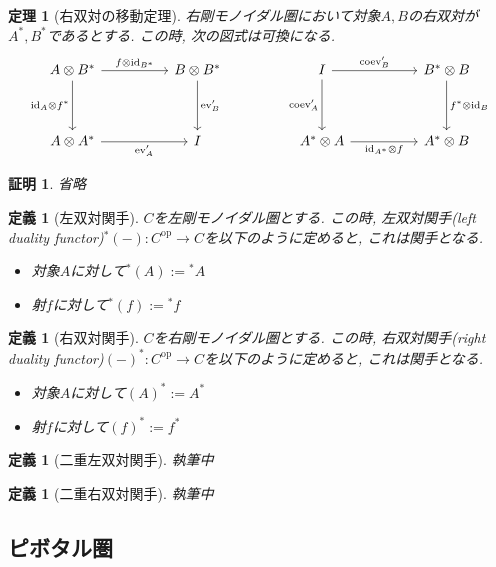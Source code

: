 \documentclass[a4paper,12pt]{ltjsarticle}
\theoremstyle{break}
\newtheorem{defn}[thm]{定義}
\newtheorem{thrm}[thm]{定理}
\newtheorem*{prf}{証明}
\newcommand{\Op}{\mathrm{op}}
\newcommand{\id}{\mathrm{id}}
\newcommand{\eva}{\mathrm{ev}}
\newcommand{\coev}{\mathrm{coev}}
\newcommand{\ot}{\otimes}
\numberwithin{equation}{section}
\begin{document}
\begin{thrm}[右双対の移動定理]
  右剛モノイダル圏において対象$A,B$の右双対が$A^*,B^*$であるとする. 
  この時, 次の図式は可換になる.  
  \[\begin{tikzcd}
    {A \ot B^*} && {B \ot B^*} && I && {B^* \ot B} \\
    \\
    {A \ot A^*} && I && {A^* \ot A} && {A^* \ot B}
    \arrow["{f \ot \id_{B^*}}", from=1-1, to=1-3]
    \arrow["{\id_A \ot f^*}"', from=1-1, to=3-1]
    \arrow["{\eva'_A}"', from=3-1, to=3-3]
    \arrow["{\eva'_B}", from=1-3, to=3-3]
    \arrow["{\coev'_B}", from=1-5, to=1-7]
    \arrow["{\coev'_A}"', from=1-5, to=3-5]
    \arrow["{\id_{A^*} \ot f}"', from=3-5, to=3-7]
    \arrow["{f^* \ot \id_B}", from=1-7, to=3-7]
  \end{tikzcd}\]
\end{thrm}

\begin{prf}
  省略
\end{prf}

\begin{defn}[左双対関手]
  $C$を左剛モノイダル圏とする. 
  この時, 左双対関手(left duality functor)${}^*(-): C^\Op \to C$を以下のように定めると, これは関手となる. 
  \begin{itemize}
    \item 対象$A$に対して${}^*(A):={}^*A$
    \item 射$f$に対して${}^*(f):={}^*f$
  \end{itemize}
\end{defn}

\begin{defn}[右双対関手]
  $C$を右剛モノイダル圏とする. 
  この時, 右双対関手(right duality functor)$(-)^*: C^\Op \to C$を以下のように定めると, これは関手となる. 
  \begin{itemize}
    \item 対象$A$に対して$(A)^*:=A^*$
    \item 射$f$に対して$(f)^*:=f^*$
  \end{itemize}
\end{defn}

\begin{defn}[二重左双対関手]
  執筆中
\end{defn}

\begin{defn}[二重右双対関手]
  執筆中
\end{defn}

\subsection{ピボタル圏}
\end{document}
